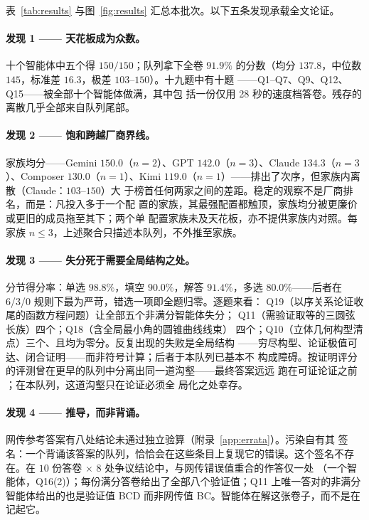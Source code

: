 \documentclass[11pt,UTF8]{ctexart}
\theoremstyle{definition}
\newcommand{\Q}[1]{Q#1}
\begin{document}
表~\ref{tab:results} 与图~\ref{fig:results}
汇总本批次。以下五条发现承载全文论证。

\paragraph{发现 1 —— 天花板成为众数。}
十个智能体中五个得 $150/150$；队列拿下全卷 $91.9\%$ 的分数（均分
$137.8$，中位数 $145$，标准差 $16.3$，极差 $103$--$150$）。十九题中有十题
——\Q{1}--\Q{7}、\Q{9}、\Q{12}、\Q{15}——被全部十个智能体做满，其中包
括一份仅用 28 秒的速度档答卷。残存的离散几乎全部来自队列尾部。

\paragraph{发现 2 —— 饱和跨越厂商界线。}
家族均分——Gemini $150.0$（$n{=}2$）、GPT $142.0$（$n{=}3$）、Claude
$134.3$（$n{=}3$）、Composer $130.0$（$n{=}1$）、Kimi
$119.0$（$n{=}1$）——排出了次序，但家族内离散（Claude：$103$--$150$）大
于榜首任何两家之间的差距。稳定的观察不是厂商排名，而是：凡投入多于一个配
置的家族，其最强配置都触顶，家族均分被更廉价或更旧的成员拖至其下；两个单
配置家族未及天花板，亦不提供家族内对照。每家族 $n\le
3$，上述聚合只描述本队列，不外推至家族。

\paragraph{发现 3 —— 失分死于需要全局结构之处。}
分节得分率：单选 $98.8\%$，填空 $90.0\%$，解答 $91.4\%$，多选
$80.0\%$——后者在 6/3/0 规则下最为严苛，错选一项即全题归零。逐题来看：
\Q{19}（以序关系论证收尾的函数方程问题）让全部五个非满分智能体失分；
\Q{11}（需验证取等的三圆弦长族）四个；\Q{18}（含全局最小角的圆锥曲线线束）
四个；\Q{10}（立体几何构型清点）三个、且均为零分。反复出现的失败是全局结构
——穷尽构型、论证极值可达、闭合证明——而非符号计算；后者于本队列已基本不
构成障碍。按证明评分的评测曾在更早的队列中分离出同一道沟壑——最终答案远远
跑在可证论证之前 \citep{petrov2025proof}；在本队列，这道沟壑只在论证必须全
局化之处幸存。

\paragraph{发现 4 —— 推导，而非背诵。}
网传参考答案有八处结论未通过独立验算（附录~\ref{app:errata}）。污染自有其
签名：一个背诵该答案的队列，恰恰会在这些条目上复现它的错误。这个签名不存
在。在 $10$ 份答卷 $\times$ $8$ 处争议结论中，与网传错误值重合的作答仅一处
（一个智能体，\Q{16}(2)）；每份满分答卷给出了全部八个验证值；\Q{11}
上唯一答对的非满分智能体给出的也是验证值 \textsf{BCD} 而非网传值
\textsf{BC}。智能体在解这张卷子，而不是在记起它。
\end{document}
